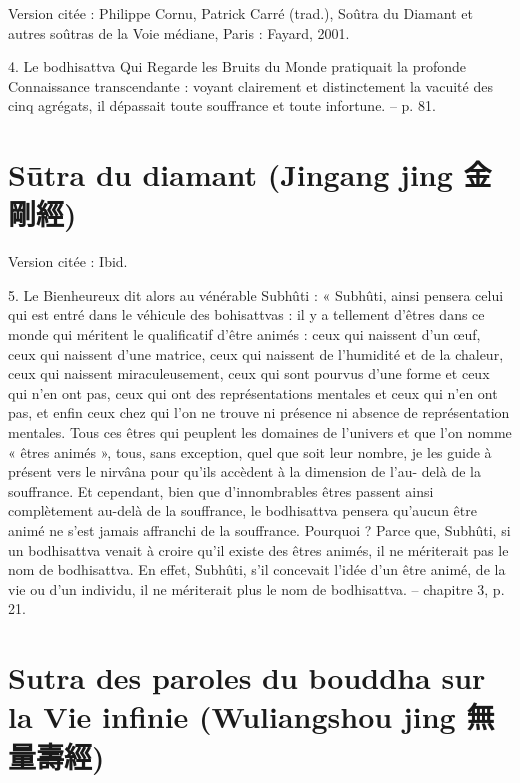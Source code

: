 Version citée : Philippe Cornu, Patrick Carré (trad.), Soûtra du Diamant et autres soûtras de la Voie médiane, Paris : Fayard, 2001.

\begin{singlequote}
    4.	Le bodhisattva Qui Regarde les Bruits du Monde pratiquait la profonde Connaissance transcendante : voyant clairement et distinctement la vacuité des cinq agrégats, il dépassait toute souffrance et toute infortune.
-- p. 81.
\end{singlequote}



\section{Sūtra du diamant (Jingang jing 金剛經)}


Version citée : Ibid.

\begin{singlequote}
    5.	Le Bienheureux dit alors au vénérable Subhûti :
« Subhûti, ainsi pensera celui qui est entré dans le véhicule des bohisattvas : il y a tellement d’êtres dans ce monde qui méritent le qualificatif d’être animés : ceux qui naissent d’un œuf, ceux qui naissent d’une matrice, ceux qui naissent de l’humidité et de la chaleur, ceux qui naissent miraculeusement, ceux qui sont pourvus d’une forme et ceux qui n’en ont pas, ceux qui ont des représentations mentales et ceux qui n’en ont pas, et enfin ceux chez qui l’on ne trouve ni présence ni absence de représentation mentales. Tous ces êtres qui peuplent les domaines de l’univers et que l’on nomme « êtres animés », tous, sans exception, quel que soit leur nombre, je les guide à présent vers le nirvâna pour qu’ils accèdent à la dimension de l’au- delà de la souffrance. Et cependant, bien que d’innombrables êtres passent ainsi complètement au-delà de la souffrance, le bodhisattva pensera qu’aucun être animé ne s’est jamais affranchi de la souffrance. Pourquoi ? Parce que, Subhûti, si un bodhisattva venait à croire qu’il existe des êtres animés, il ne mériterait pas le nom de bodhisattva. En effet, Subhûti, s’il concevait l’idée d’un être animé, de la vie ou d’un individu, il ne mériterait plus le nom de bodhisattva.
-- chapitre 3, p. 21.
\end{singlequote}

\section{Sutra des paroles du bouddha sur la Vie infinie (Wuliangshou jing 無量壽經)}


